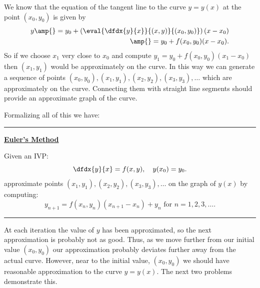 

We know that the equation of the tangent line to the curve $y=y(x)$ at
the point $(x_0,y_0)$ is given by 
\begin{align*}
  y\amp{}=y_0+\left(\eval{\dfdx{y}{x}}{(x,y)}{(x_0,y_0)}\right)(x-x_0)\\
  \amp{}=y_0+f(x_0,y_0)(x-x_0 ).
\end{align*}
So if we choose $x_1$ very close to $x_0$ and compute
$
y_1=y_0+f(x_0,y_0 )(x_1-x_0 )
$
then $(x_1,y_1)$ would be approximately on the curve. In this way we can generate
a sequence of points
$(x_0,y_0 ), (x_1,y_1 ), (x_2,y_2 ), (x_3,y_3 ),\ldots$ which are
approximately on the curve.  Connecting them with straight line
segments should provide an
approximate graph of the curve. 

\noindent{}Formalizing all of this we have:\\
\vskip2mm{}
\hrule{}
\vskip2mm{}
\centerline{\bf \Large \underline{Euler's Method}}
\vskip3mm{}
\noindent{}Given an IVP:
$$
\dfdx{y}{x} = f(x,y),\ \ \ y(x_0)=y_0.
$$
approximate points $(x_1,y_1 ), (x_2,y_2 ), (x_3,y_3 ),\ldots$   on
the graph  of $y(x)$ by computing:
$$
y_{n+1}=f(x_n,y_n )(x_{n+1}-x_n)+y_n
\text{ for } n=1, 2, 3, \ldots.$$
\hrule{}
\vskip6mm

At each iteration the value of $y$ has been approximated, so the next
approximation is probably not as good. Thus, as we move further from
our initial value $(x_0, y_0)$ our approximation probably deviates
further away from the actual curve.  However,  near to the
initial value, $(x_0,y_0)$ we should have reasonable approximation
to the curve $y=y(x)$. The next two
problems demonstrate this. 

